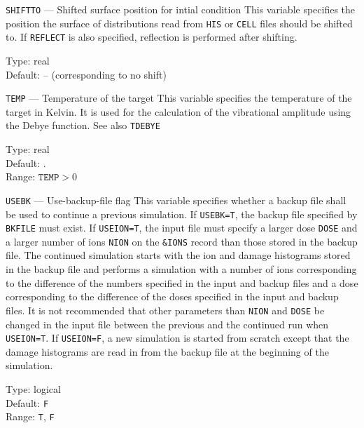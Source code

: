 \begin{keydescription}{\texttt{SHIFTTO} --- Shifted surface position for intial condition}
%
  This variable specifies the position the surface of distributions read from
  \texttt{HIS} or \texttt{CELL} files should be shifted to. If \texttt{REFLECT} 
  is also specified, reflection is performed after shifting.

  \begin{keytab}
    Type:    \> real \\
    Default: \> -- (corresponding to no shift)
  \end{keytab}
\end{keydescription}

\begin{keydescription}{\texttt{TEMP} --- Temperature of the target}
%
  This variable specifies the temperature of the target in Kelvin. It is used 
  for the calculation of the vibrational amplitude using the Debye
  function. See also \texttt{TDEBYE}

  \begin{keytab}
    Type:    \> real \\
    Default: . \\
    Range:   \> $\texttt{TEMP} > 0$
  \end{keytab}
\end{keydescription}

\begin{keydescription}{\texttt{USEBK} --- Use-backup-file flag}
%
  This variable specifies whether a backup file shall be used to
  continue a previous simulation. If \texttt{USEBK=T}, the backup file
  specified by \texttt{BKFILE} must exist. If \texttt{USEION=T}, the
  input file must specify a larger dose \texttt{DOSE} and a larger
  number of ions \texttt{NION} on the \texttt{\&IONS} record than
  those stored in the backup file. The continued simulation starts
  with the ion and damage histograms stored in the backup file and
  performs a simulation with a number of ions corresponding to the
  difference of the numbers specified in the input and backup files
  and a dose corresponding to the difference of the doses specified in
  the input and backup files.  It is not recommended that other
  parameters than \texttt{NION} and \texttt{DOSE} be changed in the
  input file between the previous and the continued run when
  \texttt{USEION=T}.  If \texttt{USEION=F}, a new simulation is
  started from scratch except that the damage histograms are read in
  from the backup file at the beginning of the simulation.
%
  \begin{keytab}
    Type:    \> logical \\
    Default: \> \texttt{F} \\
    Range:   \> \texttt{T}, \texttt{F}
  \end{keytab}
\end{keydescription}

